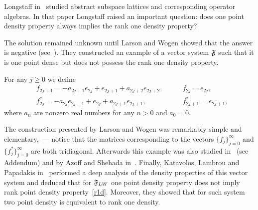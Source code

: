 \documentclass[12pt]{amsart}
\theoremstyle{case}
\begin{document}

    Long\-staff in~\cite{longstaff} studied abstract subspace lattices and corresponding operator algebras.
    In that paper Longstaff raised an important question: does one point density property always implies the rank one density property?

    The solution remained unknown until Larson and Wogen showed that the answer is negative (see~\cite{larson}).
    They constructed an example of a vector system $\mathfrak{F}$ such that it is one point dense but does not possess the rank one density property.
    \begin{example}
      \label{lw-sys}
      For any $j \geq 0$ we define
      \begin{align*}
        &f_{2j+1}=-a_{2j+1}e_{2j} + e_{2j+1} + a_{2j+2}e_{2j+2}, \qquad &f_{2j}=e_{2j},\\
        &f^*_{2j}=-a_{2j}e_{2j-1} + e_{2j} + a_{2j+1}e_{2j+1}, \qquad &f^*_{2j+1}=e_{2j+1},
      \end{align*}
      where $a_n$ are nonzero real numbers for any $n > 0$ and $a_0 = 0$.
    \end{example}
    The construction presented by Larson and Wogen was remarkably simple and elementary,~--- notice that the matrices corresponding to
      the vectors $\{f_j\}_{j=0}^\infty$ and $\{f^*_j\}_{j=0}^\infty$ are both tridiagonal.
    Afterwards this example was also studied in~\cite{argyroslambrou} (see Addendum) and by Azoff and Shehada in~\cite{azoff}.
    Finally, Katavolos, Lambrou and Papadakis in~\cite{katavolos} performed a deep analysis of the density properties
      of this vector system and deduced that for $\mathfrak{F}_{LW}$ one point density property does not imply rank point density property~\eqref{r1d}.
    Moreover, they showed that for such system two point density is equivalent to rank one density.
\end{document}

